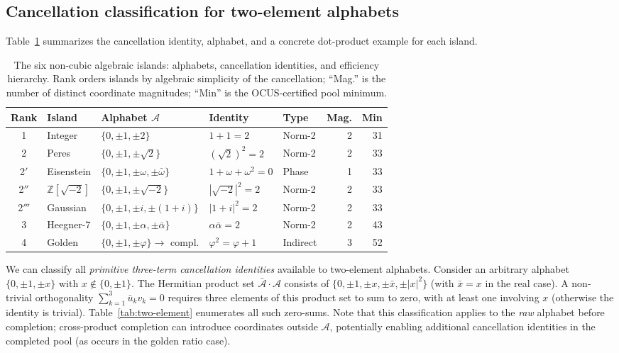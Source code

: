 \documentclass[12pt,a4paper]{article}
\newcommand{\Z}{\mathbb{Z}}
\begin{document}
\subsection{Cancellation classification for two-element alphabets}\label{sec:completeness}

Table~\ref{tab:cancellation} summarizes the cancellation identity, alphabet, and a concrete dot-product example for each island.

\begin{table}[t]
\centering
\caption{The six non-cubic algebraic islands: alphabets, cancellation identities, and efficiency hierarchy. Rank orders islands by algebraic simplicity of the cancellation; ``Mag.'' is the number of distinct coordinate magnitudes; ``Min'' is the OCUS-certified pool minimum.}
\label{tab:cancellation}
\footnotesize
\setlength{\tabcolsep}{4pt}
\begin{tabular}{@{}cllllrr@{}}
\toprule
Rank & Island & Alphabet $\mathcal{A}$ & Identity & Type & Mag. & Min \\
\midrule
1 & Integer & $\{0,\pm 1,\pm 2\}$ & $1 + 1 = 2$ & Norm-2 & 2 & 31 \\
2 & Peres & $\{0,\pm 1,\pm\!\sqrt{2}\}$ & $(\sqrt{2})^2 = 2$ & Norm-2 & 2 & 33 \\
2$'$ & Eisenstein & $\{0,\pm 1,\pm\omega,\pm\bar\omega\}$ & $1 + \omega + \omega^2 = 0$ & Phase & 1 & 33 \\
2$''$ & $\Z[\sqrt{-2}]$ & $\{0,\pm 1,\pm\!\sqrt{-2}\}$ & $|\sqrt{-2}|^2 = 2$ & Norm-2 & 2 & 33 \\
2$'''$ & Gaussian & $\{0,\pm 1,\pm i,\pm(1{+}i)\}$ & $|1{+}i|^2 = 2$ & Norm-2 & 2 & 33 \\
3 & Heegner-7 & $\{0,\pm 1,\pm\alpha,\pm\bar\alpha\}$ & $\alpha\bar\alpha = 2$ & Norm-2 & 2 & 43 \\
4 & Golden & $\{0,\pm 1,\pm\varphi\} \to$ compl. & $\varphi^2 = \varphi + 1$ & Indirect & 3 & 52 \\
\bottomrule
\end{tabular}
\end{table}

We can classify all \emph{primitive three-term cancellation identities} available to two-element alphabets.  Consider an arbitrary alphabet $\{0, \pm 1, \pm x\}$ with $x \notin \{0, \pm 1\}$.  The Hermitian product set $\bar{\mathcal{A}} \cdot \mathcal{A}$ consists of $\{0, \pm 1, \pm x, \pm \bar{x}, \pm |x|^2\}$ (with $\bar{x} = x$ in the real case).  A non-trivial orthogonality $\sum_{k=1}^3 \bar{u}_k v_k = 0$ requires three elements of this product set to sum to zero, with at least one involving $x$ (otherwise the identity is trivial).  Table~\ref{tab:two-element} enumerates all such zero-sums.  Note that this classification applies to the \emph{raw} alphabet before completion; cross-product completion can introduce coordinates outside $\mathcal{A}$, potentially enabling additional cancellation identities in the completed pool (as occurs in the golden ratio case).
\end{document}
